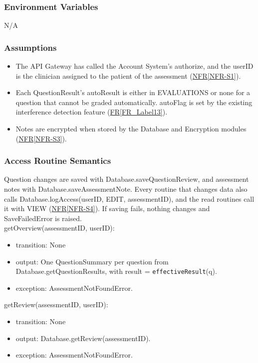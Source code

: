 \documentclass[12pt, titlepage]{article}
\newcommand{\srsref}[2]{\href{https://github.com/Nour-Fawaz/MacaBoca/blob/main/pdfs/SRS/SRS.pdf}{#1\ref*{#2}}}
\begin{document}
\subsubsection{Environment Variables}
N/A

\subsubsection{Assumptions}
\begin{itemize}
\item The API Gateway has called the Account System's authorize, and the userID is the clinician assigned to the patient of the assessment (\srsref{NFR}{NFR-S1}).
\item Each QuestionResult's autoResult is either in EVALUATIONS or none for a question that cannot be graded automatically. autoFlag is set by the existing interference detection feature (\srsref{FR}{FR_Label13}).
\item Notes are encrypted when stored by the Database and Encryption modules (\srsref{NFR}{NFR-S3}).
\end{itemize}

\subsubsection{Access Routine Semantics}

Question changes are saved with Database.saveQuestionReview, 
and assessment notes with Database.saveAssessmentNote. 
Every routine that changes data also calls Database.logAccess(userID, EDIT, assessmentID), 
and the read routines call it with VIEW (\srsref{NFR}{NFR-S4}). If saving fails, nothing changes and SaveFailedError is raised.
\\

\noindent getOverview(assessmentID, userID):
\begin{itemize}
\item transition: None
\item output: One QuestionSummary per question from Database.getQuestionResults, with result = \texttt{effectiveResult}(q).
\item exception: AssessmentNotFoundError.
\end{itemize}

\noindent getReview(assessmentID, userID):
\begin{itemize}
\item transition: None
\item output: Database.getReview(assessmentID).
\item exception: AssessmentNotFoundError.
\end{itemize}
\end{document}
